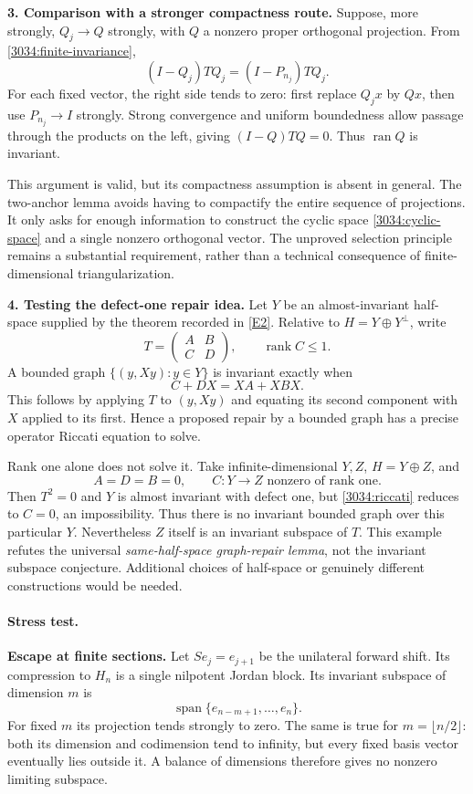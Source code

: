 \documentclass[11pt,a4paper]{article}
\newcommand{\eref}[2]{\hyperlink{extra:#1:#2}{[E#2]}}
\numberwithin{equation}{section}
\begin{document}
\medskip
\textbf{3. Comparison with a stronger compactness route.}
Suppose, more strongly, $Q_j\to Q$ strongly, with $Q$ a nonzero proper
orthogonal projection. From \eqref{3034:finite-invariance},
\[
 (I-Q_j)TQ_j=(I-P_{n_j})TQ_j.
\]
For each fixed vector, the right side tends to zero: first replace $Q_jx$
by $Qx$, then use $P_{n_j}\to I$ strongly. Strong convergence and uniform
boundedness allow passage through the products on the left, giving
$(I-Q)TQ=0$. Thus $\operatorname{ran}Q$ is invariant.

This argument is valid, but its compactness assumption is absent in general.
The two-anchor lemma avoids having to compactify the entire sequence of
projections. It only asks for enough information to construct the cyclic
space \eqref{3034:cyclic-space} and a single nonzero orthogonal vector.
The unproved selection principle remains a substantial requirement, rather
than a technical consequence of finite-dimensional triangularization.

\medskip
\textbf{4. Testing the defect-one repair idea.}
Let $Y$ be an almost-invariant half-space supplied by the theorem recorded
in \eref{3034}{2}. Relative to $H=Y\oplus Y^\perp$, write
\[
 T=\begin{pmatrix}A&B\\ C&D\end{pmatrix},\qquad\operatorname{rank}C\leq1.
\]
A bounded graph $\{(y,Xy):y\in Y\}$ is invariant exactly when
\begin{equation}\label{3034:riccati}
 C+DX=XA+XBX.
\end{equation}
This follows by applying $T$ to $(y,Xy)$ and equating its second component
with $X$ applied to its first. Hence a proposed repair by a bounded graph
has a precise operator Riccati equation to solve.

Rank one alone does not solve it. Take infinite-dimensional $Y,Z$,
$H=Y\oplus Z$, and
\[
 A=D=B=0,\qquad C:Y\to Z\text{ nonzero of rank one}.
\]
Then $T^2=0$ and $Y$ is almost invariant with defect one, but
\eqref{3034:riccati} reduces to $C=0$, an impossibility. Thus there is no
invariant bounded graph over this particular $Y$. Nevertheless $Z$ itself
is an invariant subspace of $T$. This example refutes the universal
\emph{same-half-space graph-repair lemma}, not the invariant subspace
conjecture. Additional choices of half-space or genuinely different
constructions would be needed.

\paragraph{Stress test.}
\textbf{Escape at finite sections.}
Let $S e_j=e_{j+1}$ be the unilateral forward shift. Its compression to $H_n$
is a single nilpotent Jordan block. Its invariant subspace of dimension $m$
is
\[
 \operatorname{span}\{e_{n-m+1},\ldots,e_n\}.
\]
For fixed $m$ its projection tends strongly to zero. The same is true for
$m=\lfloor n/2\rfloor$: both its dimension and codimension tend to infinity,
but every fixed basis vector eventually lies outside it. A balance of
dimensions therefore gives no nonzero limiting subspace.
\end{document}
